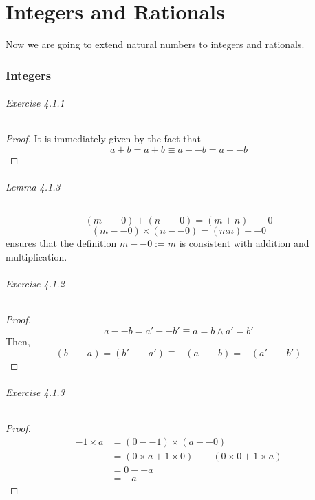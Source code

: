\part{Integers and Rationals}
Now we are going to extend natural numbers to integers and rationals.

\section{Integers}

\paragraph{Exercise 4.1.1} \label{exercise4.1.1}
\begin{proof}
It is immediately given by the fact that 
\[
a+b = a+b \equiv a -- b = a -- b
\]
\end{proof}

\paragraph{Lemma 4.1.3}
\[
(m--0)+(n--0) = (m+n)--0
\]
\[
(m--0) \times (n--0) = (mn) -- 0
\]
ensures that the definition $m--0:=m$ is consistent with addition and multiplication.

\paragraph{Exercise 4.1.2} \label{exercise4.1.2}
\begin{proof}
\[
a--b = a'--b' \equiv a=b \wedge a'=b'
\]
Then, 
\[
(b--a) = (b'--a') \equiv -(a--b) = -(a'--b')
\]
\end{proof}

\paragraph{Exercise 4.1.3} \label{exercise4.1.3}
\begin{proof}
\begin{align*}
-1 \times a 
&= (0 -- 1) \times (a -- 0) \\
&= (0\times a + 1 \times 0) -- (0 \times 0 + 1 \times a) \\
&= 0 -- a \\
&= -a
\end{align*}
\end{proof}

